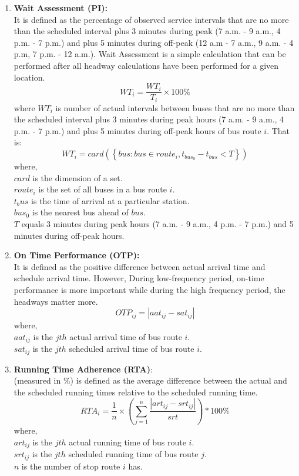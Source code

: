\documentclass[12pt,journal,compsoc]{IEEEtran}
\begin{document}
\begin{enumerate}
\item \textbf{Wait Assessment (PI):}\\
It is defined as the percentage of observed service intervals that are no more than the scheduled interval plus 3 minutes during peak (7 a.m. - 9 a.m., 4 p.m. - 7 p.m.) and plus 5 minutes during off-peak (12 a.m - 7 a.m., 9 a.m. - 4 p.m, 7 p.m. - 12 a.m.). Wait Assessment is a simple calculation that can be performed after all headway calculations have been performed for a given location.
$$WT_i = \frac{WT_i}{T_i} \times 100\%$$
where $WT_i$ is number of actual intervals between buses that are no more than the scheduled interval plus 3 minutes during peak hours (7 a.m. - 9 a.m., 4 p.m. - 7 p.m.) and plus 5 minutes during off-peak hours of bus route $i$. That is:\\
$$WT_i = card \left( \left\lbrace  bus:bus \in route_i ,  t_{bus_0} - t_{bus} < T \right\rbrace \right)$$
where,\\
$card$ is the dimension of a set. \\
$route_i$ is the set of all buses in a bus route $i$.   \\
$t_bus$ is the time of arrival at a particular station.  \\
$bus_0$ is the nearest bus ahead of $bus$.\\
$T$ equals 3 minutes during peak hours (7 a.m. - 9 a.m., 4 p.m. - 7 p.m.) and 5 minutes during off-peak hours.\\

\item \textbf{On Time Performance (OTP):}\\
It is defined as the positive difference between actual arrival time and schedule arrival time. However, During low-frequency period, on-time performance is more important while during the high frequency period, the headways matter more.
$$OTP_{ij} = |aat_{ij} - sat_{ij}|$$
where,\\
$aat_{ij}$ is the $jth$ actual arrival time of bus route $i$.\\
$sat_{ij}$ is the $jth$ scheduled arrival time of bus route $i$.\\

\item \textbf{Running Time Adherence (RTA)}:\\
(measured in $\%$) is defined as the average difference between the actual and the scheduled running times relative to the scheduled running time. 
$$RTA_i = \frac{1}{n}\times\left( \sum_{j=1}^n \frac{|art_{ij}-srt_{ij}|}{srt} \right) * 100\%$$
where,\\
$art_{ij}$ is the $jth$ actual running time of bus route $i$.\\
$srt_{ij}$ is the $jth$ scheduled running time of bus route $j$.\\
$n$ is the number of stop route $i$ has.\\


\end{enumerate}
\end{document}
